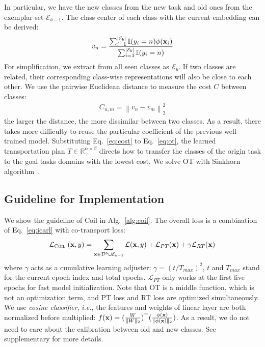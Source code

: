 \documentclass[sigconf]{acmart}
\newcommand{\x}{{\bf x}}
\newcommand{\D}{\mathcal{D}}
\newcommand{\R}{\mathbb{R}}
\newcommand{\ie}{\emph{i.e.}}
\newcommand{\name}{{\sc Coil }}
\begin{document}
In particular, we have the new classes from the new task and old ones from the exemplar set $\mathcal{E}_{b-1}$. 
The  class center of each class with the current embedding can be derived:
\begin{align} \label{eq:center}
	v_{n}= \frac{\sum_{i=1}^{|\mathcal{E}_{b}|} \mathbb{I}(y_i=n)\phi(\x_i) }{\sum_{i=1}^{|\mathcal{E}_{b}|} \mathbb{I}(y_i=n) } 
\end{align}
For simplification, we extract from all seen classes as $\mathcal{E}_{b}$. 
If two classes are related, their corresponding class-wise representations will also be close to each other. We use the pairwise Euclidean distance to measure the cost $C$ between classes:
\begin{align} \label{eq:cost}
	C_{n, m}=\left\|v_{n}-v_{m}\right\|_{2}^{2} 
\end{align}
the larger the distance, the more dissimilar between two classes. As a result, there takes more difficulty to reuse the particular coefficient of the previous well-trained model. Substituting Eq.~\ref{eq:cost} to Eq.~\ref{eq:ot}, the learned transportation plan $T \in \R_+^{\alpha \times \beta}$ directs how to transfer the classes of the origin task to the goal tasks domains with the lowest cost. We solve  OT with Sinkhorn algorithm~\cite{cuturi2013sinkhorn}.







\subsection{Guideline for Implementation} \label{sec:imp}
We show the guideline of \name in Alg.~\ref{alg:coil}. 
The overall loss  is a combination of Eq.~\ref{eq:icarl} with co-transport loss:
\begin{align} \label{eq:losscoil} 
	\mathcal{L}_\text{\name}(\x, y)= \sum_{\x \in \D^b \cup \mathcal{E}_{b-1}} \mathcal{L}(\x, y)+	\mathcal{L}_{PT}(\x) + \gamma	\mathcal{L}_{RT}(\x)
\end{align}
where $\gamma$ acts as a cumulative learning adjuster:
$\gamma=\left({t}/{T_{max}}\right)^2$, $t$ and $T_{max}$ stand for the current epoch index and total  epochs. $\mathcal{L}_{PT}$ only works at the first five epochs for fast model initialization.
Note that OT is a middle function, which is not an optimization term, and PT loss and RT loss are optimized simultaneously.
We use \emph{cosine classifier}, \ie, the features and weights of linear layer are both normalized before multiplied: $f(\x)=(\frac{W}{\|W\|_2})^\top(\frac{\phi(\x)}{\|\phi(\x)\|_2})$. As a result, we do not need to care about  the calibration  between old and new classes. 
See supplementary for more details.
\end{document}
